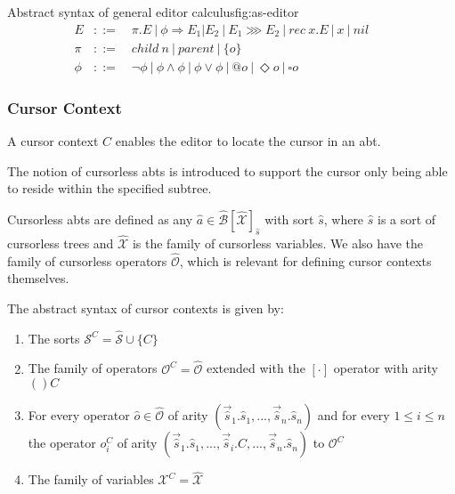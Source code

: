 \begin{myfigure}{Abstract syntax of general editor calculus}{fig:as-editor}
    \[
        \begin{aligned}
            E    & ::= \quad \pi.E \ | \ \phi \Rightarrow E_1|E_2 \ | \ E_1 \ggg E_2 \ | \ rec \ x.E \ | \ x \ | \ nil      &  & \\
            \pi  & ::= \quad child \ n \ | \ parent \ | \ \{ o \}                                                           &  & \\
            \phi & ::= \quad \neg \phi \ | \ \phi \land \phi \ | \ \phi \lor \phi \ | \ @o \ | \ \Diamond o \ | \ \square o
        \end{aligned}
    \]
\end{myfigure}

\subsubsection{Cursor Context}
A cursor context $C$ enables the editor to locate the cursor in an abt.

The notion of cursorless abts is introduced to support the cursor only being able to reside within the specified subtree.

Cursorless abts are defined as any $\hat{a} \in \hat{\mathcal{B}}[\hat{\mathcal{X}}]_{\hat{s}}$ with sort $\hat{s}$, where $\hat{s}$ is a sort of cursorless trees and $\hat{\mathcal{X}}$ is the family of cursorless variables. We also have the family of cursorless operators $\hat{\mathcal{O}}$, which is relevant for defining cursor contexts themselves.

The abstract syntax of cursor contexts is given by:
\begin{enumerate}
    \item The sorts $\mathcal{S}^C = \hat{\mathcal{S}} \cup \{C\}$
    \item The family of operators $\mathcal{O}^C = \hat{\mathcal{O}}$ extended with the $[\cdot]$ operator with arity $()C$
    \item For every operator $\hat{o} \in \hat{\mathcal{O}}$ of arity $(\vec{\hat{s}}_1.\hat{s}_1,...,\vec{\hat{s}}_n.\hat{s}_n)$ and for every $1 \leq i \leq n$ the operator $o_i^C$ of arity $(\vec{\hat{s}}_1.\hat{s}_1,...,\vec{\hat{s}}_i.C,...,\vec{\hat{s}}_n.\hat{s}_n)$ to $\mathcal{O}^C$
    \item The family of variables $\mathcal{X}^C = \hat{\mathcal{X}}$
\end{enumerate}

